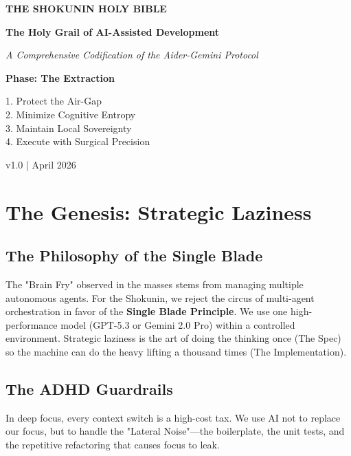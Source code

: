 \documentclass[11pt,a4paper,oneside]{book}
\begin{document}
\begin{titlepage}
    \centering
    \vspace*{2cm}
    {\Huge \textbf{THE SHOKUNIN HOLY BIBLE} \par}
    \vspace{0.5cm}
    {\Large \textbf{The Holy Grail of AI-Assisted Development} \par}
    \vspace{2cm}
    {\large \textit{A Comprehensive Codification of the Aider-Gemini Protocol} \par}
    \vspace{1cm}
    {\large \textbf{Phase: The Extraction} \par}
    \vspace{4cm}
    \begin{tcolorbox}[colback=shokunin_blue!5,colframe=shokunin_blue,title=System Directives]
        1. Protect the Air-Gap \\
        2. Minimize Cognitive Entropy \\
        3. Maintain Local Sovereignty \\
        4. Execute with Surgical Precision
    \end{tcolorbox}
    \vfill
    {\large v1.0 | April 2026 \par}
\end{titlepage}

\tableofcontents

\chapter{The Genesis: Strategic Laziness}
\section{The Philosophy of the Single Blade}
The "Brain Fry" observed in the masses stems from managing multiple autonomous agents. For the Shokunin, we reject the circus of multi-agent orchestration in favor of the \textbf{Single Blade Principle}. We use one high-performance model (GPT-5.3 or Gemini 2.0 Pro) within a controlled environment. Strategic laziness is the art of doing the thinking once (The Spec) so the machine can do the heavy lifting a thousand times (The Implementation).

\section{The ADHD Guardrails}
In deep focus, every context switch is a high-cost tax. We use AI not to replace our focus, but to handle the "Lateral Noise"—the boilerplate, the unit tests, and the repetitive refactoring that causes focus to leak.
\end{document}
